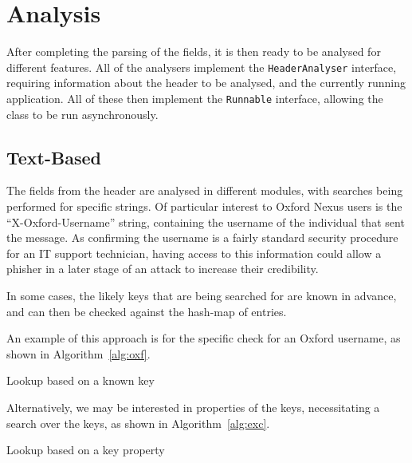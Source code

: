 \section{Analysis}

After completing the parsing of the fields, it is then ready to be analysed for
different features.  All of the analysers implement the \texttt{HeaderAnalyser}
interface, requiring information about the header to be analysed, and the
currently running application.  All of these then implement the
\texttt{Runnable} interface, allowing the class to be run asynchronously.

\subsection{Text-Based}

The fields from the header are analysed in different modules, with searches
being performed for specific strings.  Of particular interest to Oxford Nexus
users is the ``X-Oxford-Username'' string, containing the username of the
individual that sent the message.  As confirming the username is a fairly
standard security procedure for an IT support technician, having access to this
information could allow a phisher in a later stage of an attack to increase
their credibility.

In some cases, the likely keys that are being searched for are known in advance,
and can then be checked against the hash-map of entries.

An example of this approach is for the specific check for an Oxford username, as shown in Algorithm~\ref{alg:oxf}.

\begin{algorithm}[!ht]
	\caption{Lookup based on a known key}
	\label{alg:oxf}
\end{algorithm}

Alternatively, we may be interested in properties of the keys, necessitating a search over the keys, as shown in Algorithm~\ref{alg:exc}.

\begin{algorithm}[!ht]
	\caption{Lookup based on a key property}
	\label{alg:exc}
\end{algorithm}

